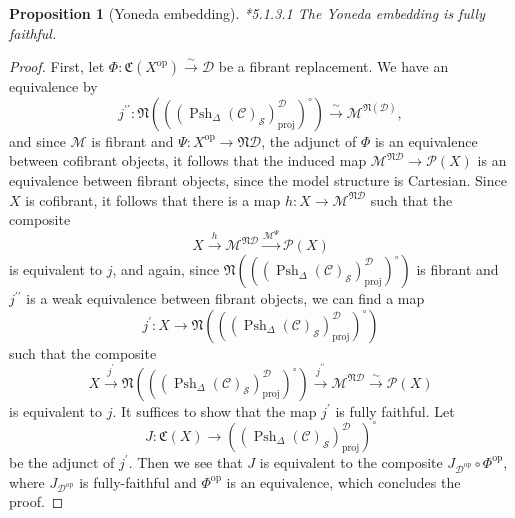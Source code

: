 \documentclass[a4paper]{article}
\numberwithin{equation}{subsection}
\theoremstyle{plain}   %
\newtheorem{prop}[equation]{Proposition}
\theoremstyle{definition}
\theoremstyle{remark}
\theoremstyle{plain}
\newcommand{\op}{\ensuremath{\mathrm{op}}}
\newcommand{\M}{\ensuremath{\mathcal{M}}}
\newcommand{\Pre}{\ensuremath{\mathcal{P}}}
\newcommand{\setS}{\ensuremath{\mathscr{S}}}
\newcommand{\spsh}{\ensuremath{\operatorname{Psh}_\Delta(\mathcal{C})}}
\begin{document}
\begin{prop}[Yoneda embedding]\cite{htt}*{5.1.3.1}
	The Yoneda embedding is fully faithful.
\end{prop}
\begin{proof} 
	First, let \(\Phi:\mathfrak{C}(X^\op)\xrightarrow{\sim} \mathcal{D}\) be a fibrant replacement.  We have an equivalence by  
	\[j^{\prime\prime}: \mathfrak{N}\left(\left((\spsh_\setS)^\mathcal{D}_\mathrm{proj}\right)^\circ\right) \xrightarrow{\sim} \M^{\mathfrak{N}(\mathcal{D})}, \]
	and since \(\M\) is fibrant and \(\Psi:X^\op \to \mathfrak{N}\mathcal{D}\), the adjunct of \(\Phi\) is an equivalence between cofibrant objects, it follows that the induced map \(\M^{\mathfrak{N}\mathcal{D}}\to \Pre(X)\) is an equivalence between fibrant objects, since the model structure is Cartesian.  Since \(X\) is cofibrant, it follows that there is a map \(h:X\to \M^{\mathfrak{N}\mathcal{D}}\) such that the composite
	\[X \xrightarrow{h} \M^{\mathfrak{N}\mathcal{D}} \xrightarrow{\M^{\Psi}} \Pre(X)\]
	is equivalent to \(j\), and again, since \(\mathfrak{N}\left(\left((\spsh_\setS)^\mathcal{D}_\mathrm{proj}\right)^\circ\right)\) is fibrant and \(j^{\prime\prime}\) is a weak equivalence between fibrant objects, we can find a map 
	\[j^\prime:X\to \mathfrak{N}\left(\left((\spsh_\setS)^\mathcal{D}_\mathrm{proj}\right)^\circ\right)\]
	such that the composite 
	\[X\xrightarrow{j^\prime} \mathfrak{N}\left(\left((\spsh_\setS)^\mathcal{D}_\mathrm{proj}\right)^\circ\right) \xrightarrow{j^{\prime\prime}} \M^{\mathfrak{N}\mathcal{D}} \xrightarrow{\sim} \Pre(X)\]
	is equivalent to \(j\).
	It suffices to show that the map \(j^\prime\) is fully faithful.  Let 
	\[J:\mathfrak{C}(X) \to \left((\spsh_\setS)^\mathcal{D}_\mathrm{proj}\right)^\circ\]
	be the adjunct of \(j^\prime\).  Then we see that \(J\) is equivalent to the composite \(J_{\mathcal{D^\op}}\circ \Phi^\op\), where \(J_{\mathcal{D^\op}}\) is fully-faithful and \(\Phi^\op\) is an equivalence, which concludes the proof.	
\end{proof}
\end{document}
